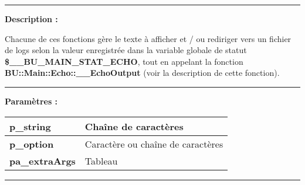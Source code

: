\documentclass[a4paper,10pt]{article}
\begin{document}

\par\noindent\rule{\textwidth}{0.4pt}

\begin{justify}
    \textbf{Description :}

    Chacune de ces fonctions gère le texte à afficher et / ou rediriger vers un fichier de logs selon la valeur enregistrée dans la variable globale de statut \textbf{\color{vars}\$\_\_BU\_MAIN\_STAT\_ECHO}, tout en appelant la fonction \textbf{\color{func}BU::Main::Echo::\_\_EchoOutput} (voir la description de cette fonction).
\end{justify}


\par\noindent\rule{\textwidth}{0.4pt}

\begin{justify}
    \textbf{Paramètres :}

    \begin{tabular}{|l|l|}
        \hline
        \textbf{\color{vars}p\_string} & Chaîne de caractères\\
        \hline
        \textbf{\color{vars}p\_option} & Caractère ou chaîne de caractères\\
        \hline
        \textbf{\color{vars}pa\_extraArgs} & Tableau\\
        \hline
    \end{tabular}
\end{justify}

\setlength{\parskip}{2em}


\par\noindent\rule{\textwidth}{0.4pt}
\end{document}
